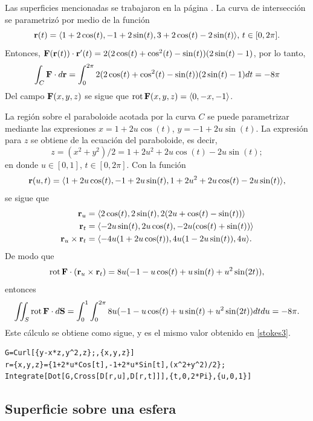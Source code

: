 Las superficies mencionadas se trabajaron en la página \pageref{curvas1}.
La curva de intersección se parametrizó por medio de la función
\[{\bf r}(t)= \langle 1+ 2\cos(t), -1+ 2\sin(t), 3+2\cos(t)-2\sin(t) \rangle, \, t \in [0,2 \pi].\]
Entonces, ${\bf F}({\bf r}(t))\cdot{\bf r}'(t)= 2(2\cos(t)+\cos^2(t)-\sin(t))(2\sin(t)-1)$,
por lo tanto,
\begin{equation}\label{stokes3}
\int_C {\bf F} \cdot d{\bf r}=\int_0^{2\pi}2(2\cos(t)+\cos^2(t)-\sin(t))(2\sin(t)-1) dt = -8\pi
\end{equation}
Del campo ${\bf F}(x,y,z)$ se sigue que ${\rm rot\,}{\bf F}(x,y,z)= \langle 0,-x,-1\rangle$.

La región sobre el paraboloide acotada por la curva $C$ se puede parametrizar mediante las expresiones
$x=1+2u\cos(t)$,  $y =-1+2u\sin(t)$.
La expresión para $z$ se obtiene de la ecuación del paraboloide, es decir,
\[z = (x^2 + y^2)/2=1+2u^2+2u\cos(t)-2u\sin(t);\] en donde $u\in [0,1]$,
$t\in [0,2\pi]$.
Con la función
\[{\bf r}(u,t)= \langle 1+2u\cos(t),-1+2u\sin(t), 1+2u^2+2u\cos(t)-2u\sin(t) \rangle,\]
se sigue que
\begin{align*}
{\bf r}_u &= \langle 2\cos(t), 2\sin(t), 2(2u +\cos(t)-\sin(t))\rangle \\
{\bf r}_t &= \langle -2 u \sin(t), 2u\cos(t),-2u(\cos(t) + \sin(t)) \rangle\\
{\bf r}_u \times {\bf r}_t &= \langle -4u(1+2u\cos(t)),4u(1-2u\sin(t)), 4 u  \rangle.
\end{align*}
De modo que
\[{\rm rot\,}{\bf F} \cdot ({\bf r}_u \times {\bf r}_t) = 8u(-1-u\cos(t)+u\sin(t)+u^2\sin(2t)),\]
entonces
\begin{gather*}
\iint_S {\rm rot\,}{\bf F}\cdot d{\bf S}=
\int_0^1\int_0^{2\pi}8u(-1-u\cos(t)+u\sin(t)+u^2\sin(2t))dtdu= -8\pi.
\end{gather*}
Este cálculo se obtiene como sigue, y es el mismo valor obtenido en \ref{stokes3}.

\begin{tcolorbox}[title=\bf Instrucción \verb"Mathematica"]\begin{Verbatim}[formatcom=\letraverbatim]
G=Curl[{y-x*z,y^2,z};,{x,y,z}]
r={x,y,z}={1+2*u*Cos[t],-1+2*u*Sin[t],(x^2+y^2)/2};
Integrate[Dot[G,Cross[D[r,u],D[r,t]]],{t,0,2*Pi},{u,0,1}]
\end{Verbatim}
\end{tcolorbox}

\subsection{Superficie sobre una esfera}

